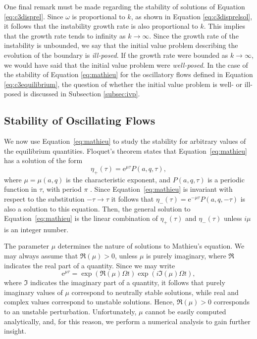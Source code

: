 One final remark must be made regarding the stability of solutions of Equation \eqref{eq:c3disprel}.
Since $\omega$ is proportional to $k$, as shown in Equation \eqref{eq:c3disprelsol}, it follows that the instability growth rate is also proportional to $k$.
This implies that the growth rate tends to infinity as $k \to \infty$.
Since the growth rate of the instability is unbounded, we say that the initial value problem describing the evolution of the boundary is \emph{ill-posed}.
If the growth rate were bounded as $k \to \infty$, we would have said that the initial value problem were \emph{well-posed}.
In the case of the stability of Equation \eqref{eq:mathieu} for the oscillatory flows defined in Equation \eqref{eq:c3equilibrium}, the question of whether the initial value problem is well- or ill-posed is discussed in Subsection \ref{subsec:ivp}.

\subsection{Stability of Oscillating Flows}
\label{subsec:oscillating}

We now use Equation~\eqref{eq:mathieu} to study the stability for arbitrary values of the equilibrium quantities.
Floquet's theorem states that Equation~\eqref{eq:mathieu} has a solution of the form
%
\[
\eta_+(\tau) = \mathrm{e}^{\mu \tau} P(a, q,\tau) ,
\]
%
where $\mu = \mu(a, q)$ is the characteristic exponent, and $P(a, q,\tau)$ is a periodic function in $\tau$, with period $\pi$ \citep[see, e.g.,][]{McLachlan1946, Abramowitz1965}.
Since Equation~\eqref{eq:mathieu} is invariant with respect to the substitution $-\tau \to \tau$ it follows that $\eta_-(\tau) = \mathrm{e}^{-\mu \tau} P(a, q,-\tau)$ is also a solution to this equation.
Then, the general solution to Equation~\eqref{eq:mathieu} is the linear combination of $\eta_+(\tau)$ and $\eta_-(\tau)$ unless $i\mu$ is an integer number.

The parameter $\mu$ determines the nature of solutions to Mathieu's equation. 
We may always assume that $\Re(\mu) > 0$, unless $\mu$ is purely imaginary, where $\Re$ indicates the real part of a quantity. Since we may write 
\[
\mathrm e^{\mu \tau} = \exp(\Re(\mu) \Omega t)\exp(i\Im(\mu) \Omega t),
\]
where $\Im$ indicates the imaginary part of a quantity, it follows that purely imaginary values of $\mu$ correspond to neutrally stable solutions, while real and complex values correspond to unstable solutions.
Hence, $\Re(\mu) > 0$ corresponds to an unstable perturbation.
Unfortunately, $\mu$ cannot be easily computed analytically, and, for this reason, we perform a numerical analysis to gain further insight.

